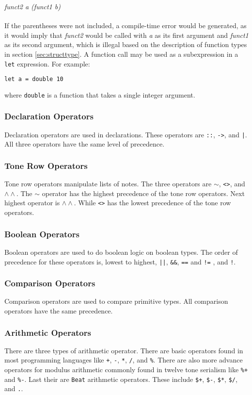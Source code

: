     \emph{funct2 a (funct1 b)}\\ \\
If the parentheses were not included, a compile-time error would be generated, as it would imply
that \emph{funct2} would be called with \emph{a} as
its first argument and \emph{funct1} as its second argument, which is illegal based on the description
of function types in section \ref{sec:structtype}.
A function call may be used as a subexpression in a \texttt{let} expression. For example:
\begin{verbatim}
let a = double 10
\end{verbatim}
where \texttt{double} is a function that takes a single integer argument. 

\subsubsection{Declaration Operators}
Declaration operators are used in declarations. These 
operators are \texttt{::}, \texttt{->}, and \texttt{|}. 
All three operators have the same level of precedence. 
\subsubsection{Tone Row Operators}
Tone row operators manipulate lists of notes. 
The three operators are $\sim$, \texttt{<>}, and $\wedge\wedge$. 
The $\sim$ operator has the highest precedence of the tone row 
operators. Next highest operator is $\wedge\wedge$. While \texttt{<>} 
has the lowest precedence of the tone row operators. 
\subsubsection{Boolean Operators}
Boolean operators are used to do boolean logic on 
boolean types. The order of precedence for these 
operators is, lowest to highest, \texttt{||}, 
\texttt{\&\&}, \texttt{==} and \texttt{!=} , and \texttt{!}. 
\subsubsection{Comparison Operators}
Comparison operators are used to compare primitive types. 
All comparison operators have the same precedence. 
\subsubsection{Arithmetic Operators}
\label{Arithmetic Operators}
There are three types of arithmetic operator. There are 
basic operators found in most programming languages like 
\texttt{+}, \texttt{-}, \texttt{*}, \texttt{/}, and \texttt{\%}. 
There are also more advance operators for modulus arithmetic commonly 
found in twelve tone serialism like \texttt{\%+} and \texttt{\%-}. 
Last their are \texttt{Beat} arithmetic operators. 
These include \texttt{\$+}, \texttt{\$-}, \texttt{\$*}, \texttt{\$/}, 
and \texttt{.}. 

